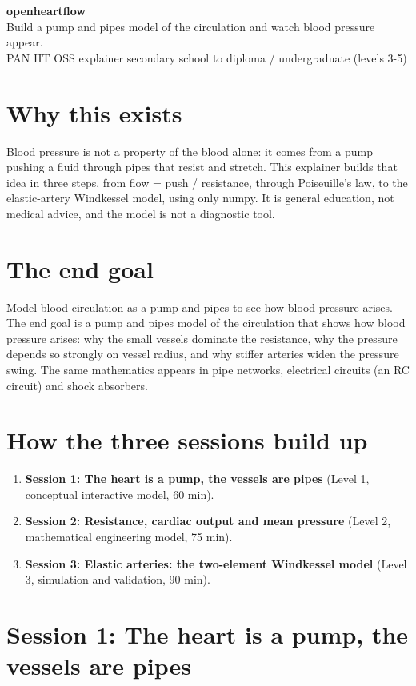 \documentclass[11pt,a4paper]{article}
\begin{document}
\begin{center}{\LARGE\bfseries openheartflow}\\[0.4em]{\large Build a pump and pipes model of the circulation and watch blood pressure appear.}\\[0.2em]\small PAN IIT OSS explainer \textbullet{} secondary school to diploma / undergraduate (levels 3-5)\end{center}

\section*{Why this exists}
Blood pressure is not a property of the blood alone: it comes from a pump pushing a fluid through pipes that resist and stretch. This explainer builds that idea in three steps, from flow = push / resistance, through Poiseuille's law, to the elastic-artery Windkessel model, using only numpy. It is general education, not medical advice, and the model is not a diagnostic tool.

\section*{The end goal}
Model blood circulation as a pump and pipes to see how blood pressure arises. The end goal is a pump and pipes model of the circulation that shows how blood pressure arises: why the small vessels dominate the resistance, why the pressure depends so strongly on vessel radius, and why stiffer arteries widen the pressure swing. The same mathematics appears in pipe networks, electrical circuits (an RC circuit) and shock absorbers.

\section*{How the three sessions build up}
\begin{enumerate}[nosep]
\item \textbf{Session 1: The heart is a pump, the vessels are pipes} (Level 1, conceptual interactive model, 60 min).
\item \textbf{Session 2: Resistance, cardiac output and mean pressure} (Level 2, mathematical engineering model, 75 min).
\item \textbf{Session 3: Elastic arteries: the two-element Windkessel model} (Level 3, simulation and validation, 90 min).
\end{enumerate}

\section{Session 1: The heart is a pump, the vessels are pipes}
\end{document}
